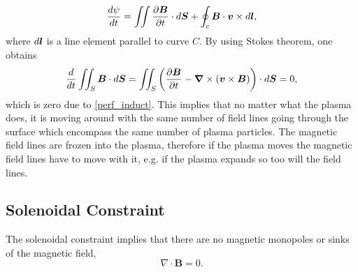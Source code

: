 \begin{equation}
    \frac{d \psi}{ dt} = \iint \frac{\partial \boldsymbol{B}}{ \partial t} \cdot d\boldsymbol{S} + \oint_c  \boldsymbol{B} \cdot \boldsymbol{v} \times d\boldsymbol{l},
\end{equation}
where $d\boldsymbol{l}$ is a line element parallel to curve $C$. By using Stokes theorem, one obtains
\begin{equation}
    \frac{d}{dt} \iint_S \boldsymbol{B} \cdot d \boldsymbol{S} = \iint_S \left( \frac{\partial \boldsymbol{B}}{\partial t} - \boldsymbol{\nabla} \times (\boldsymbol{v} \times \boldsymbol{B})  \right) \cdot d\boldsymbol{S} = 0, 
\end{equation}
which is zero due to \eqref{perf_induct}. This implies that no matter what the plasma does, it is moving around with the same number of field lines going through the surface which encompass the same number of plasma particles. The magnetic field lines are frozen into the plasma, therefore if the plasma moves the magnetic field lines have to move with it, e.g. if the plasma expands so too will the field lines.
\subsection{Solenoidal Constraint}
\label{section:cont_eq}
The solenoidal constraint implies that there are no magnetic monopoles or sinks of the magnetic field,
\begin{equation}\label{eq90}
\nabla \cdot \boldsymbol{B} = 0.
\end{equation}
